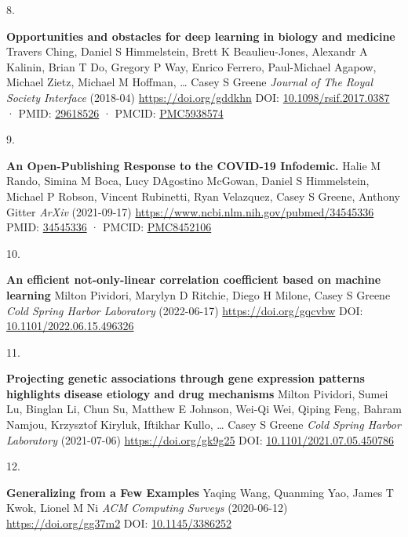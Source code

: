 \documentclass[
]{article}
\newlength{\cslhangindent}
\newlength{\csllabelwidth}
\newlength{\cslentryspacingunit} %
\newenvironment{CSLReferences}[2] %
 {%
  \setlength{\parindent}{0pt}
  \ifodd #1
  \let\oldpar\par
  \def\par{\hangindent=\cslhangindent\oldpar}
  \fi
  \setlength{\parskip}{#2\cslentryspacingunit}
 }%
 {}
\newcommand{\CSLBlock}[1]{#1\hfill\break}
\newcommand{\CSLLeftMargin}[1]{\parbox[t]{\csllabelwidth}{#1}}
\newcommand{\CSLRightInline}[1]{\parbox[t]{\linewidth - \csllabelwidth}{#1}\break}
\begin{document}
\begin{CSLReferences}{0}{0}
\leavevmode{}%
\CSLLeftMargin{8. }%
\CSLRightInline{\textbf{Opportunities and obstacles for deep learning in biology and medicine}
\CSLBlock{Travers Ching, Daniel S Himmelstein, Brett K Beaulieu-Jones, Alexandr A Kalinin, Brian T Do, Gregory P Way, Enrico Ferrero, Paul-Michael Agapow, Michael Zietz, Michael M Hoffman, \ldots{} Casey S Greene} \emph{Journal of The Royal Society Interface} (2018-04) \url{https://doi.org/gddkhn}
\CSLBlock{DOI: \href{https://doi.org/10.1098/rsif.2017.0387}{10.1098/rsif.2017.0387} · PMID: \href{https://www.ncbi.nlm.nih.gov/pubmed/29618526}{29618526} · PMCID: \href{https://www.ncbi.nlm.nih.gov/pmc/articles/PMC5938574}{PMC5938574}}}

\leavevmode{}%
\CSLLeftMargin{9. }%
\CSLRightInline{\textbf{An Open-Publishing Response to the COVID-19 Infodemic.}
\CSLBlock{Halie M Rando, Simina M Boca, Lucy D\textquotesingle Agostino McGowan, Daniel S Himmelstein, Michael P Robson, Vincent Rubinetti, Ryan Velazquez, Casey S Greene, Anthony Gitter} \emph{ArXiv} (2021-09-17) \url{https://www.ncbi.nlm.nih.gov/pubmed/34545336}
\CSLBlock{PMID: \href{https://www.ncbi.nlm.nih.gov/pubmed/34545336}{34545336} · PMCID: \href{https://www.ncbi.nlm.nih.gov/pmc/articles/PMC8452106}{PMC8452106}}}

\leavevmode{}%
\CSLLeftMargin{10. }%
\CSLRightInline{\textbf{An efficient not-only-linear correlation coefficient based on machine learning}
\CSLBlock{Milton Pividori, Marylyn D Ritchie, Diego H Milone, Casey S Greene} \emph{Cold Spring Harbor Laboratory} (2022-06-17) \url{https://doi.org/gqcvbw}
\CSLBlock{DOI: \href{https://doi.org/10.1101/2022.06.15.496326}{10.1101/2022.06.15.496326}}}

\leavevmode{}%
\CSLLeftMargin{11. }%
\CSLRightInline{\textbf{Projecting genetic associations through gene expression patterns highlights disease etiology and drug mechanisms}
\CSLBlock{Milton Pividori, Sumei Lu, Binglan Li, Chun Su, Matthew E Johnson, Wei-Qi Wei, Qiping Feng, Bahram Namjou, Krzysztof Kiryluk, Iftikhar Kullo, \ldots{} Casey S Greene} \emph{Cold Spring Harbor Laboratory} (2021-07-06) \url{https://doi.org/gk9g25}
\CSLBlock{DOI: \href{https://doi.org/10.1101/2021.07.05.450786}{10.1101/2021.07.05.450786}}}

\leavevmode{}%
\CSLLeftMargin{12. }%
\CSLRightInline{\textbf{Generalizing from a Few Examples}
\CSLBlock{Yaqing Wang, Quanming Yao, James T Kwok, Lionel M Ni} \emph{ACM Computing Surveys} (2020-06-12) \url{https://doi.org/gg37m2}
\CSLBlock{DOI: \href{https://doi.org/10.1145/3386252}{10.1145/3386252}}}


\end{CSLReferences}
\end{document}
